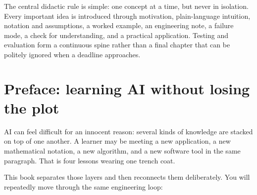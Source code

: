The central didactic rule is simple: one concept at a time, but never in
isolation.
Every important idea is introduced through motivation, plain-language
intuition, notation and assumptions, a worked example, an engineering note,
a failure mode, a check for understanding, and a practical application.
Testing and evaluation form a continuous spine rather than a final chapter
that can be politely ignored when a deadline approaches.

\chapter*{Preface: learning AI without losing the plot}

AI can feel difficult for an innocent reason: several kinds of knowledge are
stacked on top of one another.
A learner may be meeting a new application, a new mathematical notation, a
new algorithm, and a new software tool in the same paragraph.
That is four lessons wearing one trench coat.

This book separates those layers and then reconnects them deliberately.
You will repeatedly move through the same engineering loop:

\begin{center}
\label{fig:engineering-learning-loop}
\end{center}

